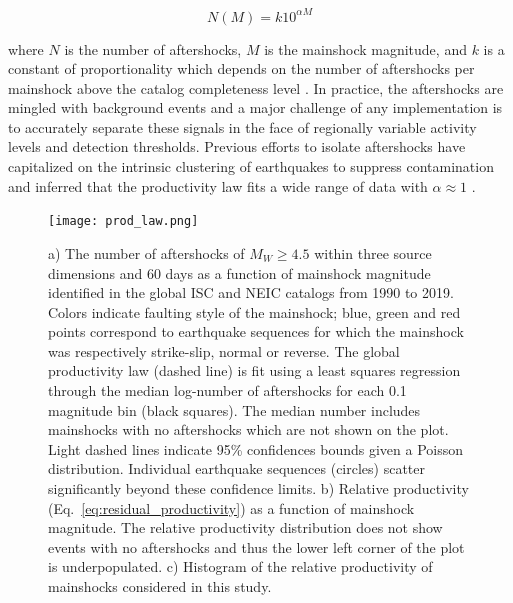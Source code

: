 \documentclass[draft, jgrga]{agujournal2018}
\begin{document}
\begin{linenomath*}
\begin{equation}\label{eq:productivity}
    N(M)=k10^{\alpha M}
\end{equation}
\end{linenomath*}
%
where $N$ is the number of aftershocks, $M$ is the mainshock magnitude, and $k$ is a constant of proportionality which depends on the number of aftershocks
per mainshock above the catalog completeness level \citep{Reasenberg1989}. In practice, the aftershocks are mingled with background events and a major challenge of any implementation is to accurately separate these signals in the face of regionally variable activity levels and detection thresholds. Previous efforts to isolate aftershocks have capitalized on the intrinsic clustering of earthquakes to suppress contamination and inferred that the productivity law fits a wide range of data with $\alpha\approx1$  \citep{Reasenberg1989, Yamanaka1990scalingshock,  DeArcangelis2016, Kisslinger1996,Tahir2015, Page}.


    \begin{figure}
        \centering
        \texttt{[image: prod\_law.png]}
        \caption{a) The number of aftershocks of $M_W\ge4.5$ within three source dimensions and 60 days as a function of mainshock magnitude identified in the global ISC and NEIC catalogs from 1990 to 2019. Colors indicate faulting style of the mainshock; blue, green and red points correspond to earthquake sequences for which the mainshock was respectively strike-slip, normal or reverse. The global productivity law (dashed line) is fit using a least squares regression through the median log-number of aftershocks for each 0.1 magnitude bin (black squares). The median number includes mainshocks with no aftershocks which are not shown on the plot. Light dashed lines indicate 95\% confidences bounds given a Poisson distribution. Individual earthquake sequences (circles) scatter significantly beyond these confidence limits. b) Relative productivity (Eq.~\ref{eq:residual_productivity}) as a function of mainshock magnitude. The relative productivity distribution does not show events with no aftershocks and thus the lower left corner of the plot is underpopulated. c) Histogram of the relative productivity of mainshocks considered in this study.
        }
        \label{fig:fms_prod}
    \end{figure}
\end{document}
